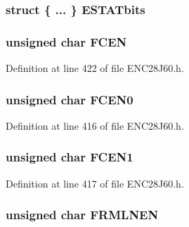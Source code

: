 \subsubsection[{E\+S\+T\+A\+Tbits}]{\setlength{\rightskip}{0pt plus 5cm}struct \{ ... \}   E\+S\+T\+A\+Tbits}\label{union___r_e_g_a549539e2c9b0db49ba5f35216fa969c4}
\hypertarget{union___r_e_g_a81b3685c69f9031d5172f47f209c1f34}{}
\subsubsection[{F\+C\+E\+N}]{\setlength{\rightskip}{0pt plus 5cm}unsigned {\bf char} F\+C\+E\+N}\label{union___r_e_g_a81b3685c69f9031d5172f47f209c1f34}


Definition at line 422 of file E\+N\+C28\+J60.\+h.

\hypertarget{union___r_e_g_a9c5a20ef37417a44af1f41817fab3cd9}{}
\subsubsection[{F\+C\+E\+N0}]{\setlength{\rightskip}{0pt plus 5cm}unsigned {\bf char} F\+C\+E\+N0}\label{union___r_e_g_a9c5a20ef37417a44af1f41817fab3cd9}


Definition at line 416 of file E\+N\+C28\+J60.\+h.

\hypertarget{union___r_e_g_aedc0154776c9ff8c21cf51e597822c6b}{}
\subsubsection[{F\+C\+E\+N1}]{\setlength{\rightskip}{0pt plus 5cm}unsigned {\bf char} F\+C\+E\+N1}\label{union___r_e_g_aedc0154776c9ff8c21cf51e597822c6b}


Definition at line 417 of file E\+N\+C28\+J60.\+h.

\hypertarget{union___r_e_g_ae6538c36466a24fef70cfae5635b35dd}{}
\subsubsection[{F\+R\+M\+L\+N\+E\+N}]{\setlength{\rightskip}{0pt plus 5cm}unsigned {\bf char} F\+R\+M\+L\+N\+E\+N}\label{union___r_e_g_ae6538c36466a24fef70cfae5635b35dd}


